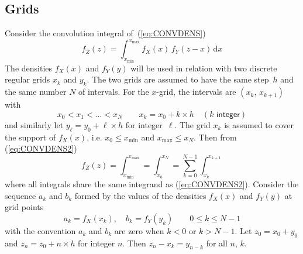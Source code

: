\documentclass[11pt,a4paper]{report}\usepackage[]{graphicx}\usepackage[]{color}
\begin{document}
\subsection{Grids}
Consider the convolution integral of~(\ref{eq:CONVDENS})
\begin{equation}
   \label{eq:CONVDENS2}
   f_Z(z)
   = \int_{x_{\textrm{min}}}^{x_{\textrm{max}}} f_X(x)\,f_Y(z-x)\,\textrm{d} x
\end{equation}
The densities $f_X(x)$ and $f_Y(y)$ will be used in relation with 
two discrete regular grids $x_k$ and $y_k$. The two grids are assumed 
to have the same step~$h$ and the same number $N$ of intervals. For the $x$-grid, 
the intervals are $(x_k,\,x_{k+1})$ with
$$
    x_0 < x_1 < \dots < x_{N}  \qquad x_k = x_0 + k\times h \quad  (k \textsf{ integer})
$$
and similarly let $y_\ell= y_0+\ell \times h$ for integer~$\ell$. The grid
$x_k$ is assumed to cover the support of $f_X(x)$, i.e. $x_0 \leqslant
x_{\textrm{min}}$ and $x_{\textrm{max}} \leqslant x_N$.  Then from (\ref{eq:CONVDENS2})
\begin{equation}
  \label{eq:CONV0N}
  f_Z(z)
   = \int_{x_{\textrm{min}}}^{x_{\textrm{max}}} 
   = \int_{x_{0}}^{x_{N}} = \sum_{k=0}^{N-1} \int_{x_{k}}^{x_{k+1}}
\end{equation}
where all integrals share the same integrand as (\ref{eq:CONVDENS2}). Consider
the sequence $a_k$ and $b_k$ formed by the values of the densities $f_X(x)$ and
$f_Y(y)$ at grid points
\begin{equation}
  \label{eq:ABRECT}
    a_k = f_X(x_k), \quad b_k = f_Y(y_k) \qquad 0 \leqslant k \leqslant N-1
\end{equation}
with the convention $a_k$ and $b_k$ are zero when $k<0$ or $k>N-1$.  
Let $z_0 = x_0 + y_0$ and $z_n = z_0 +n \times h$ for integer $n$. Then $z_n
-x_k=y_{n-k}$ for all $n$, $k$.
\end{document}
